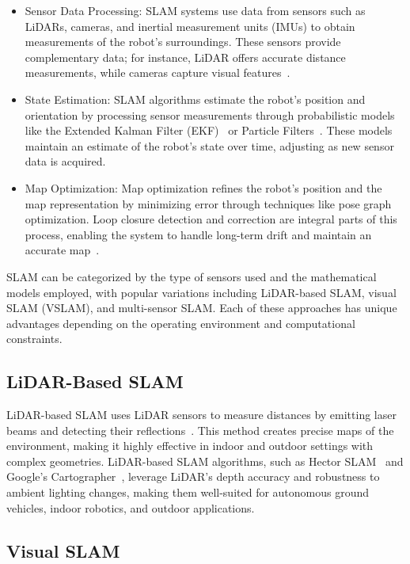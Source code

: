 \begin{itemize}
    \item Sensor Data Processing: SLAM systems use data from sensors such as LiDARs, cameras, and inertial measurement units (IMUs) to obtain measurements of the robot’s surroundings. These sensors provide complementary data; for instance, LiDAR offers accurate distance measurements, while cameras capture visual features~\cite{slam_used_sensors}.
    \item State Estimation: SLAM algorithms estimate the robot's position and orientation by processing sensor measurements through probabilistic models like the Extended Kalman Filter (EKF)~\cite{extended_kalman_filter} or Particle Filters~\cite{particle_filter}. These models maintain an estimate of the robot’s state over time, adjusting as new sensor data is acquired.
    \item Map Optimization: Map optimization refines the robot’s position and the map representation by minimizing error through techniques like pose graph optimization. Loop closure detection and correction are integral parts of this process, enabling the system to handle long-term drift and maintain an accurate map~\cite{map_optimisation}.
\end{itemize}

SLAM can be categorized by the type of sensors used and the mathematical models employed, with popular variations including LiDAR-based SLAM, visual SLAM (VSLAM), and multi-sensor SLAM. Each of these approaches has unique advantages depending on the operating environment and computational constraints.

\subsection{LiDAR-Based SLAM}

LiDAR-based SLAM uses LiDAR sensors to measure distances by emitting laser beams and detecting their reflections~\cite{lidar}. This method creates precise maps of the environment, making it highly effective in indoor and outdoor settings with complex geometries. LiDAR-based SLAM algorithms, such as Hector SLAM~\cite{hector_slam} and Google’s Cartographer~\cite{google_cartographer}, leverage LiDAR's depth accuracy and robustness to ambient lighting changes, making them well-suited for autonomous ground vehicles, indoor robotics, and outdoor applications.

\subsection{Visual SLAM}

